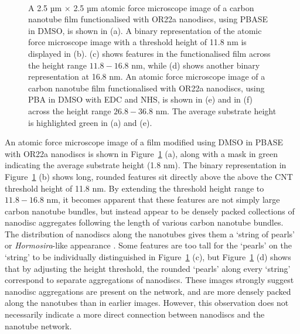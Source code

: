 \documentclass[
  a4paper,
]{scrbook}
\begin{document}
\begin{figure}
\begin{minipage}[t]{0.01\linewidth}
{\centering 

~

}

\end{minipage}%

\caption{\label{fig-DMSO-AFM-comparison}A 2.5 µm \(\times\) 2.5 µm
atomic force microscope image of a carbon nanotube film functionalised
with OR22a nanodiscs, using PBASE in DMSO, is shown in (a). A binary
representation of the atomic force microscope image with a threshold
height of 11.8 nm is displayed in (b). (c) shows features in the
functionalised film across the height range \(11.8-16.8\) nm, while (d)
shows another binary representation at 16.8 nm. An atomic force
microscope image of a carbon nanotube film functionalised with OR22a
nanodiscs, using PBA in DMSO with EDC and NHS, is shown in (e) and in
(f) across the height range \(26.8-36.8\) nm. The average substrate
height is highlighted green in (a) and (e).}

\end{figure}

An atomic force microscope image of a film modified using DMSO in PBASE
with OR22a nanodiscs is shown in Figure~\ref{fig-DMSO-AFM-comparison}
(a), along with a mask in green indicating the average substrate height
(1.8 nm). The binary representation in
Figure~\ref{fig-DMSO-AFM-comparison} (b) shows long, rounded features
sit directly above the above the CNT threshold height of 11.8 nm. By
extending the threshold height range to \(11.8-16.8\) nm, it becomes
apparent that these features are not simply large carbon nanotube
bundles, but instead appear to be densely packed collections of nanodisc
aggregates following the length of various carbon nanotube bundles. The
distribution of nanodiscs along the nanotubes gives them a `string of
pearls' or \emph{Hormosira}-like appearance
\autocite{NewZealandPlantConservationNetwork}. Some features are too
tall for the `pearls' on the `string' to be individually distinguished
in Figure~\ref{fig-DMSO-AFM-comparison} (c), but
Figure~\ref{fig-DMSO-AFM-comparison} (d) shows that by adjusting the
height threshold, the rounded `pearls' along every `string' correspond
to separate aggregations of nanodiscs. These images strongly suggest
nanodisc aggregations are present on the network, and are more densely
packed along the nanotubes than in earlier images. However, this
observation does not necessarily indicate a more direct connection
between nanodiscs and the nanotube network.
\end{document}
